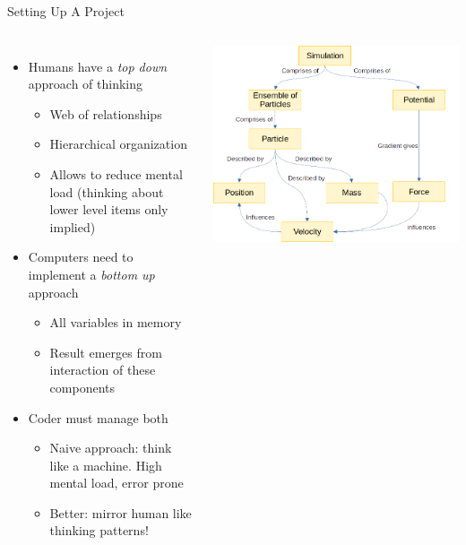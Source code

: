 \begin{frame}{Setting Up A Project}
%
\begin{columns}
\begin{itemize}
\item Humans have a \emph{top down} approach of thinking
	\begin{itemize}
	\item Web of relationships
	\item Hierarchical organization
	\item Allows to reduce mental load (thinking about lower level items only implied)
	\end{itemize}
\item Computers need to implement a \emph{bottom up} approach
	\begin{itemize}
	\item All variables in memory
	\item Result emerges from interaction of these components
	\end{itemize}
\item Coder must manage both
	\begin{itemize}
	\item Naive approach: think like a machine. High mental load, error prone
	\item Better: mirror human like thinking patterns!
	\end{itemize}
\end{itemize}
%
\includegraphics[width=\linewidth]{./gfx/01-structure}
\end{columns}
%
\end{frame}

